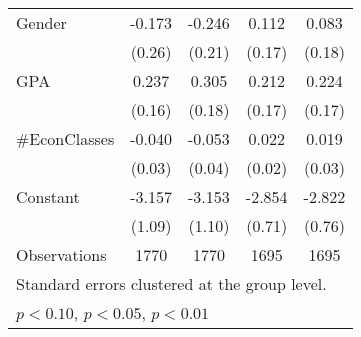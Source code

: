 {\begin{tabular}{l*{4}{c}}
Gender              &      -0.173         &      -0.246         &       0.112         &       0.083         \\
                    &      (0.26)         &      (0.21)         &      (0.17)         &      (0.18)         \\
GPA                 &       0.237         &       0.305\sym{*}  &       0.212         &       0.224         \\
                    &      (0.16)         &      (0.18)         &      (0.17)         &      (0.17)         \\
\#EconClasses        &      -0.040         &      -0.053         &       0.022         &       0.019         \\
                    &      (0.03)         &      (0.04)         &      (0.02)         &      (0.03)         \\                    
Constant            &      -3.157\sym{***}&      -3.153\sym{***}&      -2.854\sym{***}&      -2.822\sym{***}\\
                    &      (1.09)         &      (1.10)         &      (0.71)         &      (0.76)         \\
\midrule
Observations        &        1770         &        1770         &        1695         &        1695         \\
\bottomrule
\multicolumn{5}{l}{\footnotesize Standard errors clustered at the group level.}\\
\multicolumn{5}{l}{\footnotesize \sym{*} \(p<0.10\), \sym{**} \(p<0.05\), \sym{***} \(p<0.01\)}\\
\end{tabular}
}